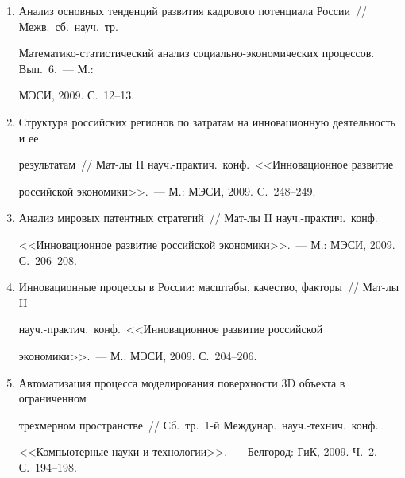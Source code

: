\begin{enumerate}[1.]
\item {}


Анализ основных тенденций развития кад\-ро\-во\-го потенциала России~// Межв.\ сб.\ науч.\ тр.\ 


Мате\-ма\-ти\-ко-ста\-ти\-сти\-че\-ский анализ социально-экономических процессов. Вып.~6.~--- М.: 


МЭСИ, 2009. С.~12--13.





\item {}


Структура российских регионов по затратам на инновационную деятельность и ее 


результатам~// Мат-лы II науч.-практич.\ конф.\ <<Инновационное развитие 


российской экономики>>.~--- М.: МЭСИ, 2009. C.~248--249.





\item {}


Анализ мировых патентных стратегий~// Мат-лы II науч.-практич.\ конф. 


<<Инновационное развитие российской экономики>>.~--- М.: МЭСИ, 2009. С.~206--208.





\item {}


Инновационные процессы в России: масштабы, качество, факторы~// Мат-лы II 


науч.-практич.\ конф.\ <<Инновационное развитие российской 


экономики>>.~--- М.: МЭСИ, 2009. С.~204--206.





\item {}


Автоматизация процесса моделирования поверхности 3D объекта в ограниченном\linebreak 


трехмерном пространстве~// Сб.\ тр.\ 1-й Междунар.\  науч.-технич.\ конф.\ 


<<Компьютерные науки и технологии>>.~--- Белгород: ГиК, 2009.  Ч.~2. С.~194--198.


\end{enumerate}





